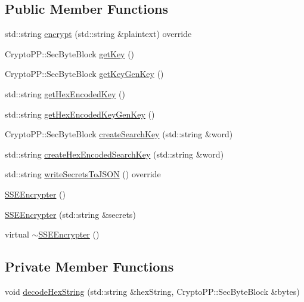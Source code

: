 \subsection*{Public Member Functions}
\begin{DoxyCompactItemize}
\item 
std\+::string \hyperlink{classSSEEncrypter_ab13571d2a7a8875226bf8901cd080949}{encrypt} (std\+::string \&plaintext) override
\item 
Crypto\+P\+P\+::\+Sec\+Byte\+Block \hyperlink{classSSEEncrypter_ae9562054f00a5f9899b019568cad2338}{get\+Key} ()
\item 
Crypto\+P\+P\+::\+Sec\+Byte\+Block \hyperlink{classSSEEncrypter_a0fa90c40369bc916f61e870fd39a42c2}{get\+Key\+Gen\+Key} ()
\item 
std\+::string \hyperlink{classSSEEncrypter_a741ba1ef98a1f1b294ed3904738cd888}{get\+Hex\+Encoded\+Key} ()
\item 
std\+::string \hyperlink{classSSEEncrypter_abaefa48cff26cad49a17a1bd2586dbc7}{get\+Hex\+Encoded\+Key\+Gen\+Key} ()
\item 
Crypto\+P\+P\+::\+Sec\+Byte\+Block \hyperlink{classSSEEncrypter_ae81cc103149e1db15c577c8b474f9217}{create\+Search\+Key} (std\+::string \&word)
\item 
std\+::string \hyperlink{classSSEEncrypter_a09dac9d519550e0375f0f677aab69bfb}{create\+Hex\+Encoded\+Search\+Key} (std\+::string \&word)
\item 
std\+::string \hyperlink{classSSEEncrypter_a70e01b58fe0de0931cdb00ee97ee4af9}{write\+Secrets\+To\+J\+S\+ON} () override
\item 
\hyperlink{classSSEEncrypter_a4b45442fa1025d82ed499241da4796bf}{S\+S\+E\+Encrypter} ()
\item 
\hyperlink{classSSEEncrypter_ae109735e8bf9f5a32d6f481e6d208bd8}{S\+S\+E\+Encrypter} (std\+::string \&secrets)
\item 
virtual \hyperlink{classSSEEncrypter_a249d1527f2d370c693534c3d435a522a}{$\sim$\+S\+S\+E\+Encrypter} ()
\end{DoxyCompactItemize}
\subsection*{Private Member Functions}
\begin{DoxyCompactItemize}
\item 
void \hyperlink{classSSEEncrypter_a668394973e3f574ca24588c5a0763f5f}{decode\+Hex\+String} (std\+::string \&hex\+String, Crypto\+P\+P\+::\+Sec\+Byte\+Block \&bytes)
\end{DoxyCompactItemize}
